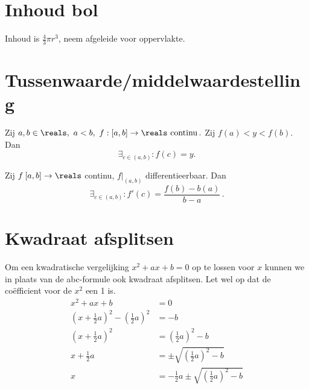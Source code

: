 \documentclass{article}
\begin{document}
    \section{Inhoud bol}\label{sec:inhoudBol}
    Inhoud is $\frac{4}{3} \pi r^3$, neem afgeleide voor oppervlakte.

    \section{Tussenwaarde/middelwaardestelling}\label{sec:tussenwaarde/middelwaardestelling}
    \begin{stelling}

        Zij $a,b \in \reals,\ a<b,\
            f:[a,b]\to \reals \text{ continu}\,.
        $
        Zij $f(a)<y<f(b)$.
        Dan \[ \exists_{c\in(a,b)}:f(c)=y. \]
    \end{stelling}

    \begin{stelling}

        Zij $f\:[a,b] \to \reals$ continu, $f|_{(a,b)}$ differentieerbaar.
        Dan
        \[
            \exists_{c \in (a,b)} : f'(c) = \frac{f(b)-b(a)}{b-a}\,.
        \]
    \end{stelling}

    \section{Kwadraat afsplitsen}\label{sec:kwadraatAfsplitsen}
    Om een kwadratische vergelijking $x^2 + ax + b = 0$ op te lossen voor $x$ kunnen we in plaats van de abc-formule ook kwadraat afsplitsen.
    Let wel op dat de co\"efficient voor de $x^2$ een 1 is.
    \begin{align*}
        x^2 + a x + b &= 0 \\
        \left(x + \frac{1}{2} a\right)^2 - \left( \frac{1}{2}a \right)^2 &= - b \\
        \left(x + \frac{1}{2} a\right)^2 &= \left( \frac{1}{2}a \right)^2 - b \\
        x + \frac{1}{2} a &= \pm \sqrt{\left( \frac{1}{2}a \right)^2 - b} \\
        x &= -  \frac{1}{2} a \pm \sqrt{\left(\frac{1}{2}a \right)^2 - b}
    \end{align*}

    \newpage
\end{document}
